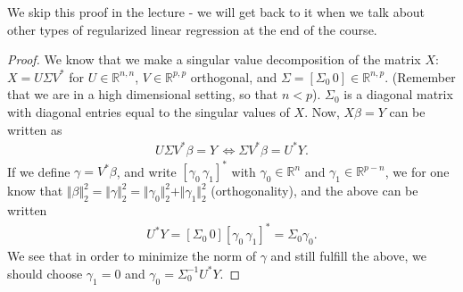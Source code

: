 \documentclass{article}
\newcommand{\R}{\mathbb{R}}
\newcommand{\norm}[1]{\Vert #1 \Vert}
\begin{document}
We skip this proof in the lecture - we will get back to it when we talk about other types of regularized linear regression at the end of the course. 

\begin{proof} 

    We know that we make a singular value decomposition of the matrix $X$: $X = U\Sigma V^*$ for $U \in \R^{n,n}$, $V\in \R^{p,p}$ orthogonal, and $\Sigma = [\Sigma_0 \, 0]\in \R^{n,p}$. (Remember that we are in a high dimensional setting, so that $n<p$). $\Sigma_0$ is a diagonal matrix with diagonal entries equal to the singular values of $X$. Now, $X\beta = Y$ can be written as
    \begin{align*}
        U \Sigma V^*\beta = Y \, \Leftrightarrow \Sigma V^*\beta = U^*Y.
    \end{align*}
    If we define $\gamma = V^*\beta$, and write $[\gamma_0 \, \gamma_1]^*$ with $\gamma_0 \in \R^n$ and $\gamma_1 \in \R^{p-n}$, we for one know that $\norm{\beta}_2^2 = \norm{\gamma}_2^2 = \norm{\gamma_0}^2_2 + \norm{\gamma_1}_2^2$ (orthogonality), and the above can be written
    \begin{align*}
        U^*Y = [\Sigma_0 \, 0 ][\gamma_0 \, \gamma_1]^* = \Sigma_0 \gamma_0.
    \end{align*}
    We see that in order to minimize the norm of $\gamma$ and still fulfill the above, we should choose $\gamma_1=0$ and $\gamma_0 = \Sigma_0^{-1}U^*Y$.


\end{proof}
\end{document}
